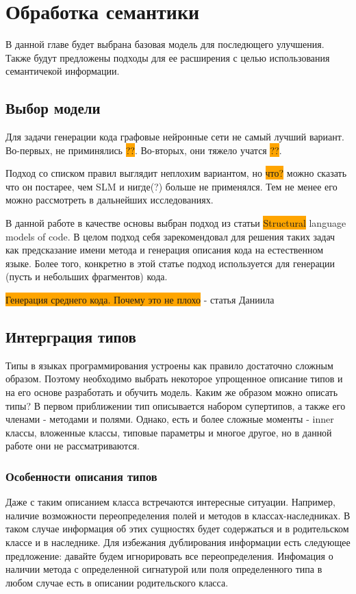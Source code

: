 \documentclass[times,specification,annotation]{itmo-student-thesis}
\begin{document}
\chapter{Обработка семантики}

В данной главе будет выбрана базовая модель для последющего улучшения. Также будут предложены подходы для ее расширения с целью использования семантичекой информации.

\section{Выбор модели}\label{sec:chooseModel}
Для задачи генерации кода графовые нейронные сети не самый лучший вариант. Во-первых, не приминялись \colorbox{orange}{??}. Во-вторых, они тяжело учатся \colorbox{orange}{??}.

Подход со списком правил выглядит неплохим вариантом, но \colorbox{orange}{что?} можно сказать что он постарее, чем SLM и нигде(?) больше не применялся. Тем не менее его можно рассмотреть в дальнейших исследованиях.

В данной работе в качестве основы выбран подход из статьи \colorbox{orange}{Structural} language models of code. В целом подход себя зарекомендовал для решения таких задач как предсказание имени метода и генерация описания кода на естественном языке. Более того, конкретно в этой статье подход используется для генерации (пусть и небольших фрагментов) кода.

\colorbox{orange}{Генерация среднего кода. Почему это не плохо} - статья Даниила

\section{Интерграция типов}\label{typeIntro}
Типы в языках программирования устроены как правило достаточно сложным образом. Поэтому необходимо выбрать некоторое упрощенное описание типов и на его основе разработать и обучить модель. Каким же образом можно описать типы? В первом приближении тип описывается набором супертипов, а также его членами - методами и полями. Однако, есть и более сложные моменты - inner классы, вложенные классы, типовые параметры и многое другое, но в данной работе они не рассматриваются.

\subsection{Особенности описания типов}\label{typeDescr}
Даже с таким описанием класса встречаются интересные ситуации. Например, наличие возможности переопределения полей и методов в классах-наследниках. В таком случае информация об этих сущностях будет содержаться и в родительском классе и в наследнике. Для избежания дублирования информации есть следующее предложение: давайте будем игнорировать все переопределения. Инфомация о наличии метода с определенной сигнатурой или поля определенного типа в любом случае есть в описании родительского класса.
\end{document}
